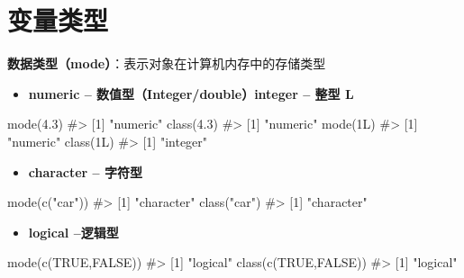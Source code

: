 \documentclass[
  letterpaper,
  DIV=11,
  numbers=noendperiod]{scrreprt}
\newenvironment{Shaded}{\begin{snugshade}}{\end{snugshade}}
\newcommand{\CommentTok}[1]{\textcolor[rgb]{0.37,0.37,0.37}{#1}}
\newcommand{\ConstantTok}[1]{\textcolor[rgb]{0.56,0.35,0.01}{#1}}
\newcommand{\FloatTok}[1]{\textcolor[rgb]{0.68,0.00,0.00}{#1}}
\newcommand{\FunctionTok}[1]{\textcolor[rgb]{0.28,0.35,0.67}{#1}}
\newcommand{\NormalTok}[1]{\textcolor[rgb]{0.00,0.23,0.31}{#1}}
\newcommand{\StringTok}[1]{\textcolor[rgb]{0.13,0.47,0.30}{#1}}
\providecommand{\tightlist}{%
  \setlength{\itemsep}{0pt}\setlength{\parskip}{0pt}}\usepackage{longtable,booktabs,array}
\begin{document}

\hypertarget{ux53d8ux91cfux7c7bux578b}{%
\chapter*{变量类型}\label{ux53d8ux91cfux7c7bux578b}}


\textbf{数据类型（mode）}：表示对象在计算机内存中的存储类型

\begin{itemize}
\tightlist
\item
  \textbf{numeric -- 数值型（Integer/double）integer -- 整型 L}
\end{itemize}

\begin{Shaded}
\begin{Highlighting}[]
\FunctionTok{mode}\NormalTok{(}\FloatTok{4.3}\NormalTok{)}
\CommentTok{\#\textgreater{} [1] "numeric"}
\FunctionTok{class}\NormalTok{(}\FloatTok{4.3}\NormalTok{)}
\CommentTok{\#\textgreater{} [1] "numeric"}
\FunctionTok{mode}\NormalTok{(1L)}
\CommentTok{\#\textgreater{} [1] "numeric"}
\FunctionTok{class}\NormalTok{(1L)}
\CommentTok{\#\textgreater{} [1] "integer"}
\end{Highlighting}
\end{Shaded}

\begin{itemize}
\tightlist
\item
  \textbf{character -- 字符型}
\end{itemize}

\begin{Shaded}
\begin{Highlighting}[]
\FunctionTok{mode}\NormalTok{(}\FunctionTok{c}\NormalTok{(}\StringTok{"car"}\NormalTok{))}
\CommentTok{\#\textgreater{} [1] "character"}
\FunctionTok{class}\NormalTok{(}\StringTok{"car"}\NormalTok{)}
\CommentTok{\#\textgreater{} [1] "character"}
\end{Highlighting}
\end{Shaded}

\begin{itemize}
\tightlist
\item
  \textbf{logical --逻辑型}
\end{itemize}

\begin{Shaded}
\begin{Highlighting}[]
\FunctionTok{mode}\NormalTok{(}\FunctionTok{c}\NormalTok{(}\ConstantTok{TRUE}\NormalTok{,}\ConstantTok{FALSE}\NormalTok{))}
\CommentTok{\#\textgreater{} [1] "logical"}
\FunctionTok{class}\NormalTok{(}\FunctionTok{c}\NormalTok{(}\ConstantTok{TRUE}\NormalTok{,}\ConstantTok{FALSE}\NormalTok{))}
\CommentTok{\#\textgreater{} [1] "logical"}
\end{Highlighting}
\end{Shaded}
\end{document}
